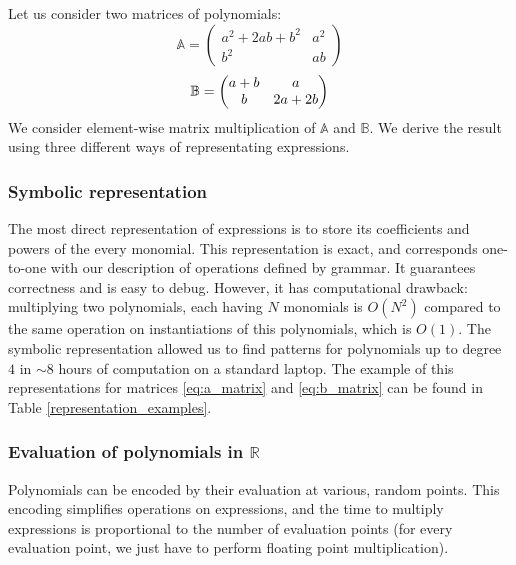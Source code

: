 Let us consider two matrices of polynomials:
\begin{equation}
\label{eq:a_matrix}
\mathbb{A} = \begin{pmatrix} a^2 + 2ab + b^2 & a^2\\ b^2 & ab \end{pmatrix} 
\end{equation}
\begin{equation}
\label{eq:b_matrix}
\mathbb{B} = \begin{pmatrix} a + b & a\\ b & 2a + 2b \end{pmatrix} \vspace{-1mm}
\vspace{-1mm}
\end{equation}
We consider element-wise matrix multiplication of $\mathbb{A}$ and
$\mathbb{B}$. We derive the result using three different ways of
representating expressions.



\subsubsection{Symbolic representation}
The most direct representation of expressions is to store its coefficients and powers of the every monomial.
This representation is exact, and corresponds one-to-one with our description of operations
defined by grammar. It guarantees correctness and is easy to debug. 
However, it has computational drawback: multiplying two polynomials, each having $N$ monomials is $O(N^2)$ compared to the same operation on instantiations of this polynomials, which is $O(1)$.
The symbolic representation allowed us
to find patterns for polynomials up to degree $4$ in $\sim 8$ hours of computation on a standard laptop. 
The example of this representations for matrices \ref{eq:a_matrix} and \ref{eq:b_matrix} can be found
in Table \ref{representation_examples}.

\subsubsection{Evaluation of polynomials in $\mathbb{R}$}
Polynomials can be encoded by their evaluation at various, random points.
This encoding simplifies operations on expressions, and the time to multiply expressions
is proportional to the number of evaluation points (for every evaluation
point, we just have to perform floating point multiplication).

